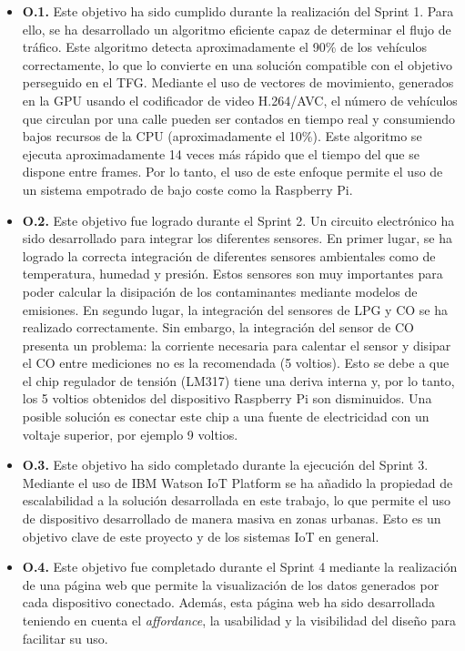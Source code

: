 \begin{itemize}
	\item \textbf{O.1.} Este objetivo ha sido cumplido durante la realización del Sprint 1. Para ello, se ha desarrollado un algoritmo eficiente capaz de determinar el flujo de tráfico. Este algoritmo detecta aproximadamente el 90\% de los vehículos correctamente, lo que lo convierte en una solución compatible con el objetivo perseguido en el \ac{TFG}. Mediante el uso de vectores de movimiento, generados en la \ac{GPU} usando el codificador de video H.264/AVC, el número de vehículos que circulan por una calle pueden ser contados en tiempo real y consumiendo bajos recursos de la \ac{CPU} (aproximadamente el 10\%). Este algoritmo se ejecuta aproximadamente 14 veces más rápido que el tiempo del que se dispone entre frames. Por lo tanto, el uso de este enfoque permite el uso de un sistema empotrado de bajo coste como la Raspberry Pi.
	
	\item \textbf{O.2.} Este objetivo fue logrado durante el Sprint 2. Un circuito electrónico ha sido desarrollado para integrar los diferentes sensores. En primer lugar, se ha logrado la correcta integración de diferentes sensores ambientales como de temperatura, humedad y presión. Estos sensores son muy importantes para poder calcular la disipación de los contaminantes mediante modelos de emisiones. En segundo lugar, la integración del sensores de LPG y CO se ha realizado correctamente. Sin embargo, la integración del sensor de CO presenta un problema: la corriente necesaria para calentar el sensor y disipar el CO entre mediciones no es la recomendada (5 voltios). Esto se debe a que el chip regulador de tensión (LM317) tiene una deriva interna y, por lo tanto, los 5 voltios obtenidos del dispositivo Raspberry Pi son disminuidos. Una posible solución es conectar este chip a una fuente de electricidad con un voltaje superior, por ejemplo 9 voltios. 
	
	\item \textbf{O.3.} Este objetivo ha sido completado durante la ejecución del Sprint 3. Mediante el uso de IBM Watson IoT Platform se ha añadido la propiedad de escalabilidad a la solución desarrollada en este trabajo, lo que permite el uso de dispositivo desarrollado de manera masiva en zonas urbanas. Esto es un objetivo clave de este proyecto y de los sistemas \ac{IoT} en general.
	
	\item \textbf{O.4.} Este objetivo fue completado durante el Sprint 4 mediante la realización de una página web que permite la visualización de los datos generados por cada dispositivo conectado. Además, esta página web ha sido desarrollada teniendo en cuenta el \textit{affordance}, la usabilidad y la visibilidad del diseño para facilitar su uso.
\end{itemize}


